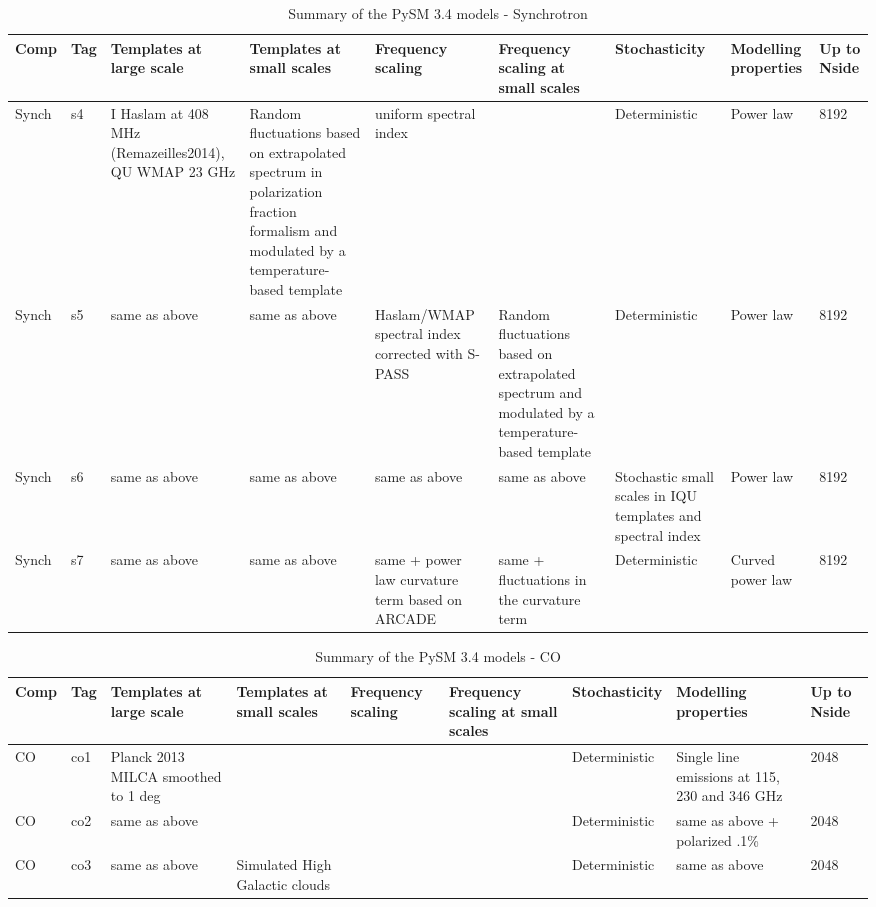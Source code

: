 \documentclass[twocolumn]{aastex631}
\begin{document}
\begin{table}[t]
\caption{Summary of the PySM 3.4 models - Synchrotron}
\begin{center}
\begin{tabular}{ | m{1cm} | m{0.5cm}| m{2cm} | m{2.2cm} | m{2cm}| m{2.2cm} | m{2cm} | m{2cm}| m{.7cm} | } 

  \toprule
Comp & Tag & Templates at large scale & Templates at small scales & Frequency scaling & Frequency scaling at small scales & Stochasticity & Modelling properties & Up to Nside \\
\midrule
Synch & s4 & I Haslam at 408 MHz (Remazeilles2014), QU WMAP 23 GHz & Random fluctuations based on extrapolated spectrum in polarization fraction formalism and modulated by a temperature-based template & uniform spectral index &  & Deterministic & Power law & 8192 \\
\hline

Synch & s5 & same as above & same as above & Haslam/WMAP spectral index corrected with S-PASS & Random fluctuations based on extrapolated spectrum and modulated by a temperature-based template & Deterministic & Power law & 8192 \\
\hline

Synch & s6 & same as above & same as above & same as above & same as above & Stochastic small scales in IQU templates and spectral index & Power law & 8192 \\
\hline

Synch & s7 & same as above & same as above & same + power law curvature term based on ARCADE & same + fluctuations in the curvature term & Deterministic & Curved power law & 8192 \\
\bottomrule
\end{tabular}
\end{center}
\label{table:summarysynch}
\end{table}

\begin{table}[t]
\caption{Summary of the PySM 3.4 models - CO}
\begin{center}
\begin{tabular}{ | m{1cm} | m{0.5cm}| m{2cm} | m{2.2cm} | m{2cm}| m{2.2cm} | m{2cm} | m{2cm}| m{.7cm} | } 

  \toprule
Comp & Tag & Templates at large scale & Templates at small scales & Frequency scaling & Frequency scaling at small scales & Stochasticity & Modelling properties & Up to Nside \\
\midrule
CO & co1 & Planck 2013 MILCA smoothed to 1 deg &  &  &  & Deterministic & Single line emissions at 115, 230 and 346 GHz & 2048 \\
\hline

CO & co2 & same as above &  &  &  & Deterministic & same as above + polarized .1\% & 2048 \\
\hline

CO & co3 & same as above & Simulated High Galactic clouds &  &  & Deterministic & same as above & 2048 \\
\bottomrule
\end{tabular}
\end{center}
\label{table:summaryco}
\end{table}
\end{document}
